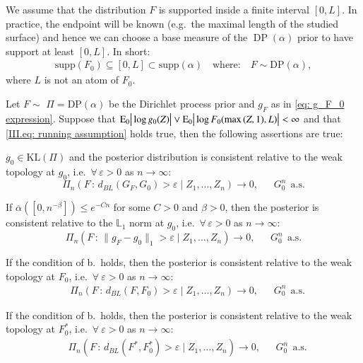We assume that the distribution $F$ is supported inside a finite interval $[0,L]$. In practice, the endpoint will be known (e.g.\ the maximal length of the studied surface) and hence we can choose a base measure of the $\operatorname{DP}(\alpha)$ prior to have support at least $[0,L]$. In short:  
\begin{align}\label{III.eq: running assumption}
    \mathrm{supp}(F_0) \subseteq [0,L] \subset \mathrm{supp}(\alpha) \quad \text{where:} \quad F \sim \mathrm{DP}(\alpha),  
\end{align}
where $L$ is not an atom of $F_0$. 
\begin{theorem}[Consistency]\label{III.thm: consistency}
Let $F \sim  \, \, \Pi  = \mathrm{DP} (\alpha)$ be the Dirichlet process prior and $g_{\scriptscriptstyle{F}}$ as in \eqref{eq: g_F_0 expression}. Suppose that $\mathrm{E}_0 \big| \log{g_0} (Z) \big| \vee \mathrm{E}_0 \big| \log{F_0(\max{(Z,1)},L)} \big|  < \infty$ and that \eqref{III.eq: running assumption} holds true, then the following assertions are true: 
\begin{thmlist}
\item $g_0 \in \mathrm{KL}(\Pi)$ and the posterior distribution is consistent relative to the weak topology at $g_0$, i.e.\ $\forall \, \varepsilon >0$ as $n \rightarrow \infty$:\label{III.thm: weak topology consistency}
$$  \Pi_n(F \, : \, d_{\scriptscriptstyle{BL}} (G_{\scriptscriptstyle{F}} , G_0)> \varepsilon \mid Z_1,\ldots,Z_n) \rightarrow 0, \: \: \: \: \: \: \: G^n_0 \: \: \text{a.s.}$$
\item If $\overline{\alpha}([0,n^{-\beta}]) \leq e^{-Cn}$ for some $C >0$ and $\beta >0$, then the posterior is consistent relative to the $\mathbb{L}_1$ norm at $g_0$, i.e.\ $\forall \, \varepsilon >0$ as $n \rightarrow \infty$:\label{III.thm: L1 consistency}
$$  \Pi_n (F \, : \, \|g_{\scriptscriptstyle{F}} - g_0\|_1 > \varepsilon \mid Z_1,\ldots,Z_n ) \rightarrow 0, \: \: \: \: \: \: \: G^n_0 \: \: \text{a.s.}$$
\item If the condition of b.\ holds, then the posterior is consistent relative to the weak topology at $F_0$, i.e.\ $\forall \: \varepsilon > 0$ as $n \rightarrow \infty$:\label{III.thm: weak consistency underlying}
\begin{align*}
     &\Pi_n \left(F \, : \, d_{\scriptscriptstyle{BL}} \left( F,F_0 \right) > \varepsilon \mid Z_1,\ldots,Z_n \right) \rightarrow 0, \: \: \: \: \: \: \:  G^n_0 \: \: \text{a.s.}
\end{align*}
\item If the condition of b.\ holds, then the posterior is consistent relative to the weak topology at $F^*_0$, i.e.\ $\forall \: \varepsilon > 0$ as $n \rightarrow \infty$:\label{III.thm: weak consistency underlying F^*}
\begin{align*}
     &\Pi_n \left(F \, : \, d_{\scriptscriptstyle{BL}} \left( F^*,F^*_0 \right) > \varepsilon \mid Z_1,\ldots,Z_n \right) \rightarrow 0, \: \: \: \: \: \: \:  G^n_0 \: \: \text{a.s.}
\end{align*}
\end{thmlist} 
\end{theorem}

